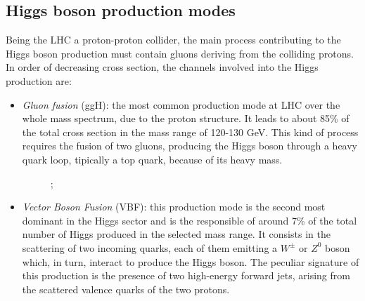 \subsection{Higgs boson production modes}
Being the LHC a proton-proton collider, the main process contributing to the Higgs boson production must contain gluons deriving from the colliding protons.
In order of decreasing cross section, the channels involved into the Higgs production are:
\begin{itemize}
\item \emph{Gluon fusion} (ggH): the most common production mode at LHC over the whole mass spectrum, due to the proton structure. It leads to about 85\% of the total cross section in the mass range of 120-130 GeV. This kind of process requires the fusion of two gluons, producing the Higgs boson through a heavy quark loop, tipically a top quark, because of its heavy mass.
\begin{figure}[H]
\centering
{};
\end{figure}
\item \emph{Vector Boson Fusion} (VBF): this production mode is the second most dominant in the Higgs sector and is the responsible of around 7\% of the total number of Higgs produced in the selected mass range. It consists in the scattering of two incoming quarks, each of them emitting a $W^{\pm}$ or $Z^0$ boson which, in turn, interact to produce the Higgs boson. The peculiar signature of this production is the presence of two high-energy forward jets, arising from the scattered valence quarks of the two protons.
\begin{figure*}[h]
\centering
{}
\end{figure*}
\end{itemize}
